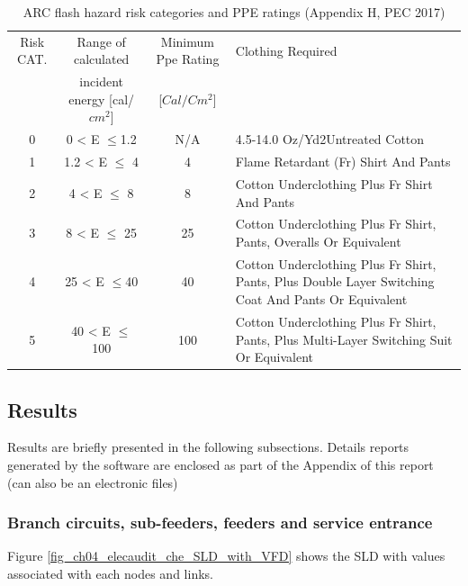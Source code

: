 \begin{table}[!htb]
	\caption{ARC flash hazard risk categories and PPE ratings (Appendix H, PEC 2017)}
	\label{tbl_ch04_elecaudit_arcflash}
	{\scriptsize
		
\begin{tabular}{c|c|c|p{6cm}}
	\hline
	Risk CAT. & Range of calculated  & Minimum Ppe Rating & Clothing Required \\ 
	& incident energy [cal/$cm^2$] & [$Cal/Cm^2$] &  \\ 
	\hline
	0 & 0 < E $\leq$1.2 & N/A & 4.5-14.0 Oz/Yd2Untreated Cotton \\ 
	1 & 1.2 < E $\leq$ 4 & 4 & Flame Retardant (Fr) Shirt And Pants \\ 
	2 & 4 < E $\leq$ 8 & 8 & Cotton Underclothing Plus Fr Shirt And Pants \\ 
	3 & 8 < E $\leq$ 25 & 25 & Cotton Underclothing Plus Fr Shirt, Pants, Overalls Or Equivalent \\ 
	4 & 25 < E $\leq$40 & 40 & Cotton Underclothing Plus Fr Shirt, Pants, Plus Double Layer Switching Coat And Pants Or Equivalent \\ 
	5 & 40 < E $\leq$ 100 & 100 & Cotton Underclothing Plus Fr Shirt, Pants, Plus Multi-Layer Switching Suit Or Equivalent \\ 
	\hline
	\end{tabular}
		
	}%
\end{table}

\subsection{Results}
Results are briefly presented in the following subsections. Details reports generated by the software are enclosed as part of the Appendix of this report (can also be an electronic files)

\subsubsection{Branch circuits, sub-feeders, feeders and service entrance}
Figure \ref{fig_ch04_elecaudit_che_SLD_with_VFD} shows the SLD with values associated with each nodes and links.

